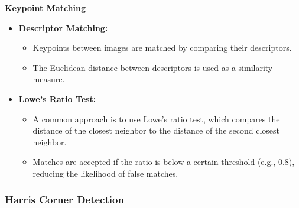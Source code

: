 \documentclass{article}
\begin{document}
\textbf{Keypoint Matching}
\begin{itemize}
    \item \textbf{Descriptor Matching:}
    \begin{itemize}
        \item Keypoints between images are matched by comparing their descriptors.
        \item The Euclidean distance between descriptors is used as a similarity measure.
    \end{itemize}
    
    \item \textbf{Lowe's Ratio Test:}
    \begin{itemize}
        \item A common approach is to use Lowe's ratio test, which compares the distance of the closest neighbor to the distance of the second closest neighbor.
        \item Matches are accepted if the ratio is below a certain threshold (e.g., 0.8), reducing the likelihood of false matches.
    \end{itemize}
\end{itemize}

\subsubsection{Harris Corner Detection}
\end{document}
